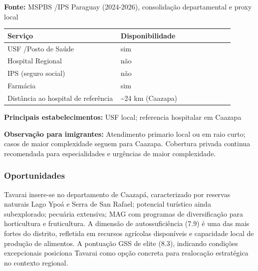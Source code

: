 \textbf{Fonte:} MSPBS /\allowbreak  IPS Paraguay (2024-2026), consolidação
departamental e proxy local

{\def\LTcaptype{none} %
\begin{longtable}{@{}>{\raggedright\arraybackslash}p{0.45\linewidth} >{\raggedright\arraybackslash}p{0.45\linewidth}@{}}
\toprule\noalign{}
Serviço & Disponibilidade \\
\midrule\noalign{}
\endhead
\bottomrule\noalign{}
\endlastfoot
USF /\allowbreak  Posto de Saúde & sim \\
Hospital Regional & não \\
IPS (seguro social) & não \\
Farmácia & sim \\
Distância ao hospital de referência & \textasciitilde24 km (Caazapa) \\
\end{longtable}
}

\textbf{Principais estabelecimentos:} USF local; referencia hospitalar
em Caazapa

\textbf{Observação para imigrantes:} Atendimento primario local ou em
raio curto; casos de maior complexidade seguem para Caazapa. Cobertura
privada continua recomendada para especialidades e urgências de maior
complexidade.
\newpage

\subsubsection*{Oportunidades}\label{oport-tavarai-0611}
Tavarai insere-se no departamento de Caazapá, caracterizado por reservas naturais Lago Ypoá e Serra de San Rafael; potencial turístico ainda subexplorado; pecuária extensiva; MAG com programas de diversificação para horticultura e fruticultura. A dimensão de autossuficiência (7.9) é uma das mais fortes do distrito, refletida em recursos agrícolas disponíveis e capacidade local de produção de alimentos. A pontuação GSS de elite (8.3), indicando condições excepcionais posiciona Tavarai como opção concreta para realocação estratégica no contexto regional.

